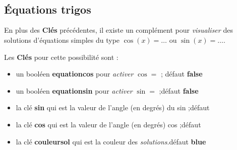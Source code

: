 \documentclass{article}
\newcommand\Cle[1]{{\bfseries\sffamily\textlangle #1\textrangle}}
\begin{document}
\begin{codesortie}
\begin{center}
	\begin{tikzpicture}[line join=bevel]
		\cercletrigoPL[rayon=2.5,affvaleurs=false,decal=8pt]
	\end{tikzpicture}
	~~~~
	\begin{tikzpicture}[line join=bevel]
		\cercletrigoPL[rayon=2.5,affangles=false]
	\end{tikzpicture}
	~~~~
	\begin{tikzpicture}[line join=bevel]
		\cercletrigoPL[rayon=2.5,moinspi=false,couleurfond=orange!15,taillevaleurs=\tiny]
	\end{tikzpicture}
\end{center}
\end{codesortie}

\subsection{Équations trigos}

\begin{codeinfo}
En plus des \Cle{Clés} précédentes, il existe un complément pour \textit{visualiser} des solutions d'équations simples du type $\cos(x)=\ldots$ ou $\sin(x)=\ldots$.
\end{codeinfo}

\begin{codecles}
Les \Cle{Clés} pour cette possibilité sont :

\begin{itemize}
	\item un booléen \Cle{equationcos} pour \textit{activer} \og $\cos=$ \fg; \hfill{}défaut \Cle{false}
	\item un booléen \Cle{equationsin} pour \textit{activer} \og $\sin=$ \fg;\hfill{}défaut \Cle{false}
	\item la clé \Cle{sin} qui est la valeur de l'angle (en degrés) du sin ;\hfill{}défaut \Cle{30}
	\item la clé \Cle{cos} qui est la valeur de l'angle (en degrés) cos ;\hfill{}défaut \Cle{45}
	\item la clé \Cle{couleursol} qui est la couleur des \textit{solutions}.\hfill{}défaut \Cle{blue}
\end{itemize}
\end{codecles}
\end{document}

